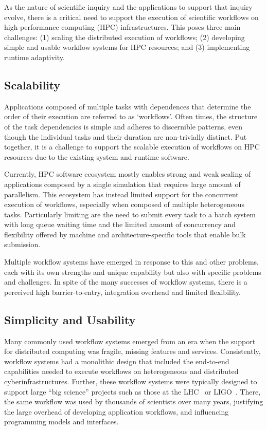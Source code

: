 \documentclass[conference]{IEEEtran}
\begin{document}
As the nature of scientific inquiry and the applications to support that
inquiry evolve, there is a critical need to support the execution of
scientific workflows on high-performance computing (HPC) infrastructures.
This poses three main challenges: (1) scaling the distributed execution of
workflows; (2) developing simple and usable workflow systems for HPC
resources; and (3) implementing runtime adaptivity.

\subsection{Scalability}

Applications composed of multiple tasks with dependences that determine the
order of their execution are referred to as `workflows'. Often times, the
structure of the task dependencies is simple and adheres to discernible
patterns, even though the individual tasks and their duration are
non-trivially distinct. Put together, it is a challenge to support the
scalable execution of workflows on HPC resources due to the existing system
and runtime software.

Currently, HPC software ecosystem mostly enables strong and weak scaling of
applications composed by a single simulation that requires large amount of
parallelism. This ecosystem has instead limited support for the concurrent
execution of workflows, especially when composed of multiple heterogeneous
tasks. Particularly limiting are the need to submit every task to a batch
system with long queue waiting time and the limited amount of concurrency and
flexibility offered by machine and architecture-specific tools that enable
bulk submission.

Multiple workflow systems have emerged in response to this and other
problems, each with its own strengths and unique capability but also with
specific problems and challenges. In spite of the many successes of workflow
systems, there is a perceived high barrier-to-entry, integration overhead and
limited flexibility.

\subsection{Simplicity and Usability}

Many commonly used workflow systems emerged from an era when the support for
distributed computing was fragile, missing features and services.
Consistently, workflow systems had a monolithic design that included the
end-to-end capabilities needed to execute workflows on heterogeneous and
distributed cyberinfrastructures. Further, these workflow systems were
typically designed to support large ``big science'' projects such as those at
the LHC~\cite{breskin2009cern} or LIGO~\cite{althouse1992ligo}. There, the
same workflow was used by thousands of scientists over many years, justifying
the large overhead of developing application workflows, and influencing
programming models and interfaces.
\end{document}
